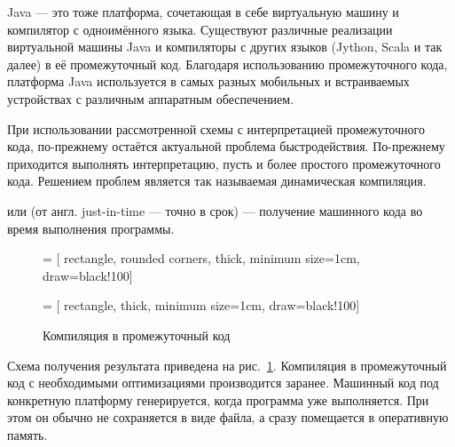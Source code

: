 Java — это тоже платформа, сочетающая в себе виртуальную машину и
компилятор с одноимённого языка. Существуют различные реализации
виртуальной машины Java и компиляторы с других языков (Jython, Scala и
так далее) в её промежуточный код. Благодаря использованию
промежуточного кода, платформа Java используется в самых разных
мобильных и встраиваемых устройствах с различным аппаратным
обеспечением.

При использовании рассмотренной схемы с интерпретацией промежуточного
кода, по-прежнему остаётся актуальной проблема быстродействия.
По-прежнему приходится выполнять интерпретацию, пусть и более простого
промежуточного кода. Решением проблем является так называемая
динамическая компиляция.

\begin{defn}
   или
   (от англ. just-in-time — точно
  в срок) — получение машинного кода во время выполнения программы.
\end{defn}

\begin{figure}
  \begin{centering}
     = [
      rectangle,
      rounded corners,
      thick,
      minimum size=1cm,
      draw=black!100]
    
     = [
      rectangle,
      thick,
      minimum size=1cm,
      draw=black!100]
    
    \par
  \end{centering}

  \caption{Компиляция в промежуточный код\label{fig:jit}}
\end{figure}

Схема получения результата приведена на рис.~\ref{fig:jit}. Компиляция
в промежуточный код с необходимыми оптимизациями производится
заранее. Машинный код под конкретную платформу генерируется, когда
программа уже выполняется. При этом он обычно не сохраняется в виде
файла, а сразу помещается в оперативную память.

